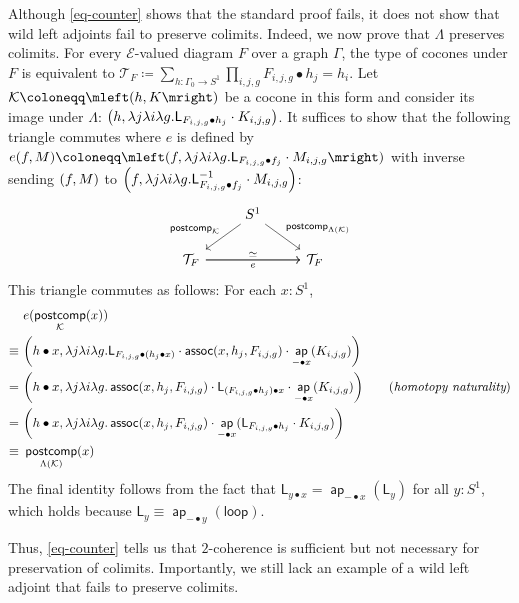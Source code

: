 \documentclass[10pt,a4paper]{article}
\theoremstyle{definition}
\theoremstyle{remark}
\newcommand{\E}{\mathcal E}
\newcommand{\K}{\mathcal K}
\renewcommand{\L}{\mathsf L}
\newcommand{\loopp}{\mathsf{loop}}
\newcommand{\0}{\mathbf{0}}
\newcommand{\1}{\mathbf{1}}
\newcommand{\2}{\mathbf{2}}
\DeclareMathOperator{\assoc}{\mathsf{assoc}}
\DeclareMathOperator{\ap}{\mathsf{ap}}
\DeclareMathOperator{\postcomp}{\mathsf{postcomp}}
\begin{document}
Although \autoref{eq-counter} shows that the standard proof fails, it does not show that wild left adjoints fail to preserve colimits. Indeed, we now prove that $\Lambda$ preserves colimits. For every $\E$-valued diagram $F$ over a graph $\Gamma$, the type of cocones under $F$ is equivalent to  $\mathcal{T}_F \coloneqq \sum_{h : \Gamma_0 \to S^1}\prod_{i,j,g}F_{i,j,g} \bullet h_j = h_i$. Let $\K \coloneqq \mleft(h,K\mright)$ be a cocone in this form and consider its image under $\Lambda$: $\mleft(h, \lambda{j}\lambda{i}\lambda{g}.\L_{F_{i,j,g} \bullet h_j} \cdot K_{i,j,g} \mright)$. It suffices to show that the following triangle commutes where $e$ is defined by $e(f, M) \coloneqq \mleft(f,\lambda{j}\lambda{i}\lambda{g}.\L_{F_{i,j,g} \bullet f_j} \cdot M_{i,j,g} \mright)$ with inverse sending $\mleft(f,M\mright)$ to $\mleft(f,\lambda{j}\lambda{i}\lambda{g}.\L_{F_{i,j,g} \bullet f_j}^{-1} \cdot M_{i,j,g}  \mright)$:
\[
\begin{tikzcd}
	& {S^1} & \\
	{\mathcal{T}_F} && {\mathcal{T}_F}
	\arrow["{\postcomp_{\K}}"', from=1-2, to=2-1]
	\arrow["{\postcomp_{\Lambda(\K)}}", from=1-2, to=2-3]
	\arrow["e"', from=2-1, to=2-3]
	\arrow["\simeq", from=2-1, to=2-3]
\end{tikzcd}
\] This triangle commutes as follows: For each $x : S^1$,
\begin{align*}
& \ e(\postcomp_{\K}(x)) 
\\  \equiv & \   \mleft(h \bullet x, \lambda{j}\lambda{i}\lambda{g}.\L_{F_{i,j,g}\bullet \mleft(h_j\bullet x\mright)} \cdot \assoc(x,h_j, F_{i,j,g}) \cdot \ap_{{-} \bullet x}(K_{i,j,g})\mright)
\\ = & \ \mleft(h \bullet x, \lambda{j}\lambda{i}\lambda{g}. \assoc(x,h_j, F_{i,j,g}) \cdot \L_{\mleft(F_{i,j,g}\bullet h_j\mright)\bullet x} \cdot \ap_{{-} \bullet x}(K_{i,j,g})\mright) \tag{$\textit{homotopy naturality}$}
\\ = & \ \mleft(h \bullet x, \lambda{j}\lambda{i}\lambda{g}.\assoc(x,h_j, F_{i,j,g}) \cdot \ap_{{-} \bullet x}(\L_{F_{i,j,g} \bullet h_j} \cdot K_{i,j,g})\mright)
\\ \equiv & \ \postcomp_{\Lambda(\K)}(x) 
\end{align*}
The final identity follows from the fact that $\L_{y \bullet x} = \ap_{{-}\bullet x}(\L_y)$ for all $y : S^1$, which holds because $\L_{y} \equiv \ap_{{-} \bullet y}(\loopp)$.

Thus, \autoref{eq-counter} tells us that $2$-coherence is sufficient but not necessary for preservation of colimits. Importantly, we still lack an example of a wild left adjoint that fails to preserve colimits.
\end{document}

